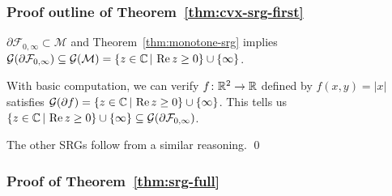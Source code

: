 \documentclass[10pt,mathserif]{beamer}
\begin{document}
\begin{frame}
\frametitle{Proof outline of Theorem~\ref{thm:cvx-srg-first}}
$\partial \mathcal{F}_{0,\infty}\subset \mathcal{M}$ and Theorem~\ref{thm:monotone-srg}
 implies ${\mathcal{G}}(\partial \mathcal{F}_{0,\infty})\subseteq{\mathcal{G}}({\mathcal{M}})= \{z\in\mathbb{C}\,|\,\operatorname{Re} z\ge 0\}\cup\{\infty\}$.
 
 \vspace{0.2in}
With basic computation, we can verify $f\colon\mathbb{R}^2\rightarrow\mathbb{R}$ defined by $f(x,y)=|x|$ satisfies ${\mathcal{G}}(\partial f)=\{z\in\mathbb{C}\,|\,\operatorname{Re} z\ge 0\}\cup\{\infty\}$. This tells us $\{z\in\mathbb{C}\,|\,\operatorname{Re} z\ge 0\}\cup\{\infty\}\subseteq{\mathcal{G}}(\partial \mathcal{F}_{0,\infty})$.

%

\vspace{0.2in}
The other SRGs follow from a similar reasoning.
\qed
\end{frame}

\begin{frame}
\frametitle{Proof of Theorem~\ref{thm:srg-full}}

\end{frame}
\end{document}
